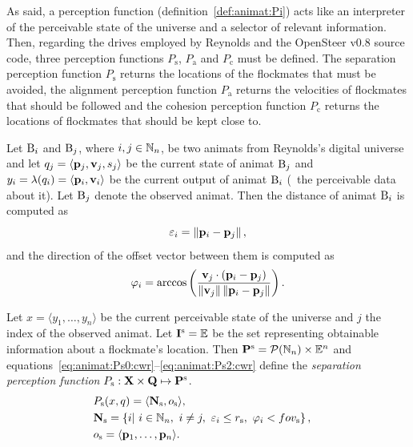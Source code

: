 As said, a perception function (definition~\ref{def:animat:Pi}) acts like an interpreter of the perceivable state of the universe and a selector of relevant information. Then, regarding the drives employed by Reynolds and the OpenSteer v0.8 source code, three perception functions $P_\mathrm{s}$, $P_\mathrm{a}$ and $P_\mathrm{c}$ must be defined. The separation perception function $P_\mathrm{s}$ returns the locations of the flockmates that must be avoided, the alignment perception function $P_\mathrm{a}$ returns the velocities of flockmates that should be followed and the cohesion perception function $P_\mathrm{c}$ returns the locations of flockmates that should be kept close to. 

Let ${\mathrm{B}}_i$ and ${\mathrm{B}}_j$, where $i,j \in \mathbb{N}_n$, be two animats from Reynolds's digital universe and let $q_j=\langle{\ensuremath{\mathbf{p}}}_j,{\mathbf{v}}_j,s_j\rangle$ be the current state of animat ${\mathrm{B}}_j$ and $y_i=\lambda(q_i)=\langle {\ensuremath{\mathbf{p}}}_i,{\mathbf{v}}_i \rangle$ be the current output of animat ${\mathrm{B}}_i$ (\ie\ the perceivable data about it). Let ${\mathrm{B}}_j$ denote the observed animat. Then the distance of animat ${\mathrm{B}}_i$ is computed as
%
\begin{equation}
\varepsilon_i%
 =\left\|\vect{p}_i - \vect{p}_j\right\|, \label{eq:animat:cwr:distance}
\end{equation}
%
and the direction of the offset vector between them is computed as
%
\begin{equation}
\varphi_i%
 =\arccos \left( \frac {\vect{v}_j \cdot (\vect{p}_i - \vect{p}_j)}{\left\| \vect{v}_j \right\| \left\| \vect{p}_i - \vect{p}_j \right\|} \right). \label{eq:animat:cwr:angularOffset}
\end{equation}

\begin{defn}
\label{def:animat:Ps:cwr}
Let $x=\langle y_1,\ldots,y_n\rangle$ be the current perceivable state of the universe and $j$ the index of the observed animat. Let ${\mathbf{I}}^\mathrm{s}=\mathbb{E}$ be the set representing obtainable information about a flockmate's location. Then ${\mathbf{P}}^\mathrm{s}={\mathcal{P}(\mathbb{N}_n)} \times \mathbb{E}^n$ and equations~\eqref{eq:animat:Ps0:cwr}--\eqref{eq:animat:Ps2:cwr} define the \emph{separation perception function} $P_\mathrm{s}: {\mathbf{X}} \times {\ensuremath{\mathbf{Q}}} \mapsto {\ensuremath{\mathbf{P}}}^\mathrm{s}$.
\begin{eqnarray}
& P_\mathrm{s}(x,q)=\langle\set{N}_\mathrm{s},o_\mathrm{s}\rangle, & \label{eq:animat:Ps0:cwr} \\
& \set{N}_\mathrm{s}=\left\{i|\ i \in \N_n,\ i \neq j,\ \varepsilon_i%
 \leq r_\mathrm{s},\ \varphi_i%
 < \fov_\mathrm{s} \right\}, & \\ 
& o_\mathrm{s}=\langle \vect{p}_1,\ldots,\vect{p}_n\rangle. & \label{eq:animat:Ps2:cwr}
\end{eqnarray}
\end{defn}

